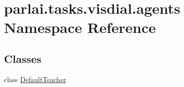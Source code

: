\hypertarget{namespaceparlai_1_1tasks_1_1visdial_1_1agents}{}\section{parlai.\+tasks.\+visdial.\+agents Namespace Reference}
\label{namespaceparlai_1_1tasks_1_1visdial_1_1agents}
\subsection*{Classes}
\begin{DoxyCompactItemize}
\item 
class \hyperlink{classparlai_1_1tasks_1_1visdial_1_1agents_1_1DefaultTeacher}{Default\+Teacher}
\end{DoxyCompactItemize}
